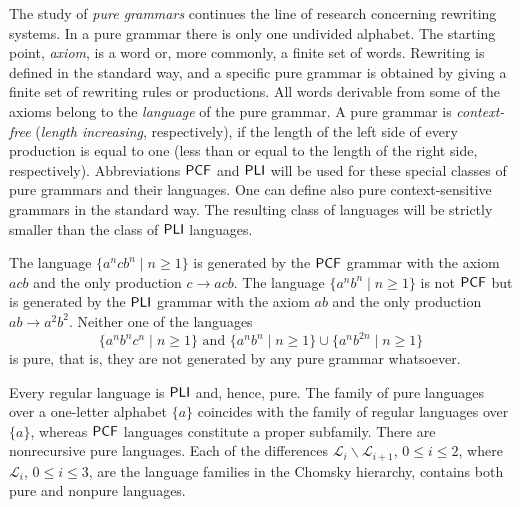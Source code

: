 The study of \emph{pure grammars} continues the line of research concerning rewriting systems. In a pure grammar there is only one undivided alphabet. The starting point, \emph{axiom}, is a word or, more commonly, a finite set of words. Rewriting is defined in the standard way, and a specific pure grammar is obtained by giving a finite set of rewriting rules or productions. All words derivable from some of the axioms belong to the \emph{language} of the pure grammar. A pure grammar is \emph{context-free} (\emph{length increasing}, respectively), if the length of the left side of every production is equal to one (less than or equal to the length of the right side, respectively). Abbreviations \index{$\PCF$}$\PCF$ and \index{$\PLI$}$\PLI$ will be used for these special classes of pure grammars and their languages. One can define also  pure context-sensitive grammars in the standard way. The resulting class of languages will be strictly smaller than the class of $\PLI$ languages.

The language $\{a^n c b^n \mid n \ge 1\}$ is generated by the $\PCF$ grammar with the axiom $acb$ and the only production $c \to acb$. The language $\{a^n b^n \mid n \ge 1\}$ is not $\PCF$ but is generated by the $\PLI$ grammar with the axiom $ab$ and the only production $ab \to a^2 b^2$. Neither one of the languages
$$\{a^n b^n c^n \mid n \ge 1\} \text{ and } \{a^n b^n \mid n \ge 1\} \cup \{a^n b^{2n} \mid n \ge 1\}$$
is pure, that is, they are not generated by any pure grammar whatsoever.

Every regular language is $\PLI$ and, hence, pure. The family of pure languages over a one-letter alphabet $\{a\}$ coincides with the family of regular languages over $\{a\}$, whereas $\PCF$ languages constitute a proper subfamily. There are nonrecursive pure languages. Each of the differences $\mathcal{L}_i \backslash \mathcal{L}_{i+1}$, $0 \le i \le 2$, where $\mathcal{L}_i$, $0 \le i \le 3$, are the language families in the Chomsky hierarchy, contains both pure and nonpure languages.


